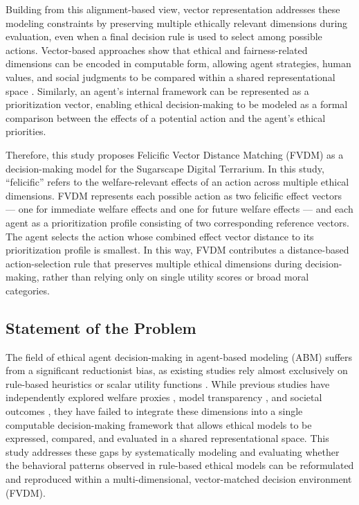 \documentclass{icsthesis}
\begin{document}
\begin{mainmatter}
Building from this alignment-based view, vector representation addresses these modeling constraints by preserving multiple ethically relevant dimensions during evaluation, even when a final decision rule is used to select among possible actions. Vector-based approaches show that ethical and fairness-related dimensions can be encoded in computable form, allowing agent strategies, human values, and social judgments to be compared within a shared representational space \citep{Bontempi2025, Izzidien2022}. Similarly, an agent's internal framework can be represented as a prioritization vector, enabling ethical decision-making to be modeled as a formal comparison between the effects of a potential action and the agent's ethical priorities.

Therefore, this study proposes Felicific Vector Distance Matching (FVDM) as a decision-making model for the Sugarscape Digital Terrarium. In this study, ``felicific'' refers to the welfare-relevant effects of an action across multiple ethical dimensions. FVDM represents each possible action as two felicific effect vectors --- one for immediate welfare effects and one for future welfare effects --- and each agent as a prioritization profile consisting of two corresponding reference vectors. The agent selects the action whose combined effect vector distance to its prioritization profile is smallest. In this way, FVDM contributes a distance-based action-selection rule that preserves multiple ethical dimensions during decision-making, rather than relying only on single utility scores or broad moral categories.

			\subsection{Statement of the Problem}
The field of ethical agent decision-making in agent-based modeling (ABM) suffers from a significant reductionist bias, as existing studies rely almost exclusively on rule-based heuristics or scalar utility functions \citep{EpsteinAxtell1996, KremerHerman2024b, LasquetyReyes2018}. While previous studies have independently explored welfare proxies \citep{Baujard2009, Li2002}, model transparency \citep{Bontempi2025, doi:10.1177/29498732251377351}, and societal outcomes \citep{Tolk2022, Munda2020}, they have failed to integrate these dimensions into a single computable decision-making framework that allows ethical models to be expressed, compared, and evaluated in a shared representational space. This study addresses these gaps by systematically modeling and evaluating whether the behavioral patterns observed in rule-based ethical models can be reformulated and reproduced within a multi-dimensional, vector-matched decision environment (FVDM).



\end{mainmatter}
\end{document}
